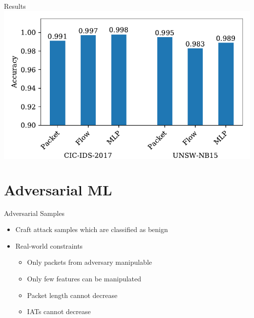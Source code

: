\documentclass{beamer}
\begin{document}
\begin{frame}{Results}
\vspace*{-49pt}
\includegraphics[width=\columnwidth]{figures/results.pdf}

\vspace*{-130pt}
\end{frame}


\section{Adversarial ML}
\begin{frame}{Adversarial Samples}
\begin{itemize}
\item Craft attack samples which are classified as benign \vspace{10pt}
\item Real-world constraints
\begin{itemize}
\item Only packets from adversary manipulable
\item Only few features can be manipulated
\item Packet length cannot decrease
\item IATs cannot decrease
\end{itemize}
\end{itemize}
\end{frame}
\end{document}
